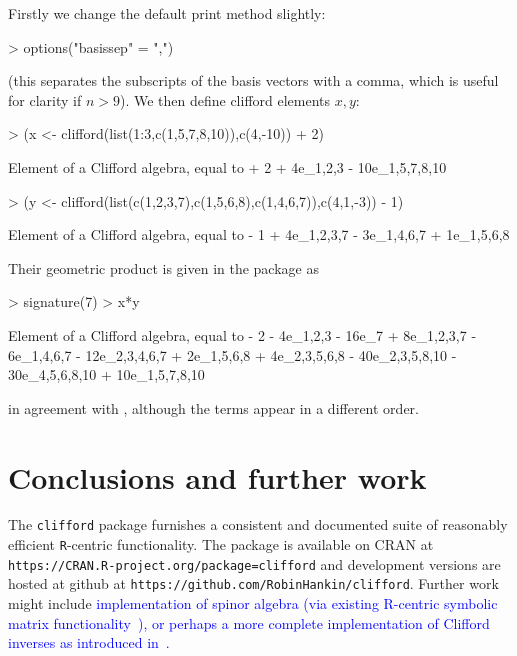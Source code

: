 \documentclass{birkjour}
\theoremstyle{definition}
\theoremstyle{remark}
\numberwithin{equation}{section}
\begin{document}
Firstly we change the default print method slightly:

\begin{Schunk}
\begin{Sinput}
> options("basissep" = ",")
\end{Sinput}
\end{Schunk}

(this separates the subscripts of the basis vectors with a comma,
which is useful for clarity if $n>9$).  We then define clifford
elements $x,y$:

\begin{Schunk}
\begin{Sinput}
> (x <- clifford(list(1:3,c(1,5,7,8,10)),c(4,-10)) + 2)
\end{Sinput}
\begin{Soutput}
Element of a Clifford algebra, equal to
+ 2 + 4e_1,2,3 - 10e_1,5,7,8,10
\end{Soutput}
\begin{Sinput}
> (y <- clifford(list(c(1,2,3,7),c(1,5,6,8),c(1,4,6,7)),c(4,1,-3)) - 1)
\end{Sinput}
\begin{Soutput}
Element of a Clifford algebra, equal to
- 1 + 4e_1,2,3,7 - 3e_1,4,6,7 + 1e_1,5,6,8
\end{Soutput}
\end{Schunk}

Their geometric product is given in the package as

\begin{Schunk}
\begin{Sinput}
> signature(7)
> x*y
\end{Sinput}
\begin{Soutput}
Element of a Clifford algebra, equal to
- 2 - 4e_1,2,3 - 16e_7 + 8e_1,2,3,7 - 6e_1,4,6,7 - 12e_2,3,4,6,7 +
2e_1,5,6,8 + 4e_2,3,5,6,8 - 40e_2,3,5,8,10 - 30e_4,5,6,8,10 +
10e_1,5,7,8,10
\end{Soutput}
\end{Schunk}

in agreement with \cite{ablamowicz2012}, although the terms appear in
a different order.

\section{Conclusions and further work}

The {\tt clifford} package furnishes a consistent and documented suite
of reasonably efficient {\tt R}-centric functionality.  The package is
available on CRAN at
\verb+https://CRAN.R-project.org/package=clifford+ and development
versions are hosted at github at
\verb+https://github.com/RobinHankin/clifford+.  Further work might
include \textcolor{blue}{implementation of spinor algebra (via
  existing R-centric symbolic matrix
  functionality~\cite{hankin2023_jordan,hankin2006_onion}), or perhaps
  a more complete implementation of Clifford inverses as introduced
  in~\cite{hitzer2017}.}
\end{document}
